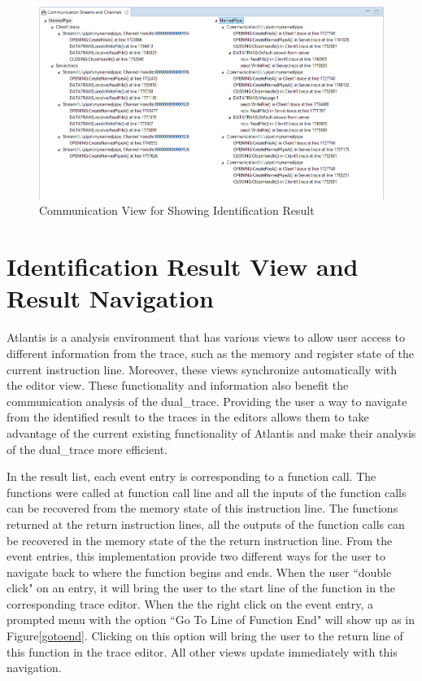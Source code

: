 \begin{figure}[H]
\centerline{\includegraphics[scale=0.7]{Figures/idenview}}
 \caption{Communication View for Showing Identification Result}
\label{idenview}
\end{figure}

\section{Identification Result View and Result Navigation}
Atlantis is a analysis environment that has various views to allow user access to different information from the trace, such as the memory and register state of the current instruction line. Moreover, these views synchronize automatically with the editor view. These functionality and information also benefit the communication analysis of the dual\_trace. Providing the user a way to navigate from the identified result to the traces in the editors allows them to take advantage of the current existing functionality of Atlantis and make their analysis of the dual\_trace more efficient.

In the result list, each event entry is corresponding to a function call. The functions were called at function call line and all the inputs of the function calls can be recovered from the memory state of this instruction line. The functions returned at the return instruction lines, all the outputs of the function calls can be recovered in the memory state of the the return instruction line. From the event entries, this implementation provide two different ways for the user to navigate back to where the function begins and ends. When the user ``double click" on an entry, it will bring the user to the start line of the function in the corresponding trace editor. When the the right click on the event entry, a prompted menu with the option ``Go To Line of Function End" will show up as in Figure\ref{gotoend}. Clicking on this option will bring the user to the return line of this function in the trace editor. All other views update immediately with this navigation. 

